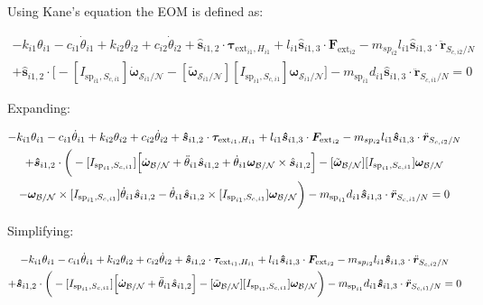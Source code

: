 \documentclass[paper]{aiaaNew}
\begin{document}
Using Kane's equation the EOM is defined as:

\begin{multline}
-k_{i1} \theta_{i1} - c_{i1} \dot{\theta}_{i1} + k_{i2} \theta_{i2} + c_{i2} \dot{\theta}_{i2} + \bm{\hat{s}}_{i1,2} \cdot \bm \tau_{\text{ext}_{i1},H_{i1}}  + l_{i1} \bm{\hat{s}}_{i1,3} \cdot \bm F_{\text{ext}_{i2}}  - m_{sp_{i2}} l_{i1} \bm{\hat{s}}_{i1,3} \cdot \ddot{\bm{r}}_{S_{c,i2}/N} \\
+ \bm{\hat{s}}_{i1,2} \cdot \Big[-[I_{\text{sp}_{i1},S_{c,i1}}] \dot{\bm\omega}_{\mathcal{S}_{i1}/\mathcal{N}}  -[\tilde{\bm \omega}_{\mathcal{S}_{i1}/\mathcal{N}}] [I_{\text{sp}_{i1},S_{c,i1}}] \bm \omega_{\mathcal{S}_{i1}/\mathcal{N}} \Big] -m_{\text{sp}_{i1}} d_{i1} \bm{\hat{s}}_{i1,3} \cdot \ddot{\bm{r}}_{S_{c,i1}/N} = 0
\end{multline}

Expanding:

\begin{multline}
-k_{i1} \theta_{i1} - c_{i1} \dot{\theta}_{i1} + k_{i2} \theta_{i2} + c_{i2} \dot{\theta}_{i2} + \bm{\hat{s}}_{i1,2} \cdot \bm \tau_{\text{ext}_{i1},H_{i1}}  + l_{i1} \bm{\hat{s}}_{i1,3} \cdot \bm F_{\text{ext}_{i2}}  - m_{sp_{i2}} l_{i1} \bm{\hat{s}}_{i1,3} \cdot \ddot{\bm{r}}_{S_{c,i2}/N} \\
+ \bm{\hat{s}}_{i1,2} \cdot \bigg(-[I_{\text{sp}_{i1},S_{c,i1}}] \Big[\dot{\bm \omega}_{\cal{B/N}} + \ddot{\theta}_{i1} \hat{\bm s}_{i1,2} + \dot{\theta}_{i1} \bm \omega_{\cal{B/N}} \times \hat{\bm s}_{i1,2}\Big] 
-[\tilde{\bm \omega}_{\cal{B/N}}] [I_{\text{sp}_{i1},S_{c,i1}}] \bm \omega_{\cal{B/N}}\\
 -\bm \omega_{\cal{B/N}} \times [I_{\text{sp}_{i1},S_{c,i1}}] \dot{\theta}_{i1} \hat{\bm s}_{i1,2} -\dot{\theta}_{i1} \hat{\bm s}_{i1,2} \times [I_{\text{sp}_{i1},S_{c,i1}}] \bm \omega_{\cal{B/N}}\bigg) -m_{\text{sp}_{i1}} d_{i1} \bm{\hat{s}}_{i1,3} \cdot \ddot{\bm{r}}_{S_{c,i1}/N} = 0
\end{multline}

Simplifying:

\begin{multline}
	-k_{i1} \theta_{i1} - c_{i1} \dot{\theta}_{i1} + k_{i2} \theta_{i2} + c_{i2} \dot{\theta}_{i2} + \bm{\hat{s}}_{i1,2} \cdot \bm \tau_{\text{ext}_{i1},H_{i1}}  + l_{i1} \bm{\hat{s}}_{i1,3} \cdot \bm F_{\text{ext}_{i2}}  - m_{sp_{i2}} l_{i1} \bm{\hat{s}}_{i1,3} \cdot \ddot{\bm{r}}_{S_{c,i2}/N} \\
	+ \bm{\hat{s}}_{i1,2} \cdot \bigg(-[I_{\text{sp}_{i1},S_{c,i1}}] \Big[\dot{\bm \omega}_{\cal{B/N}} + \ddot{\theta}_{i1} \hat{\bm s}_{i1,2}\Big]  
	-[\tilde{\bm \omega}_{\cal{B/N}}] [I_{\text{sp}_{i1},S_{c,i1}}] \bm \omega_{\cal{B/N}} \bigg) -m_{\text{sp}_{i1}} d_{i1} \bm{\hat{s}}_{i1,3} \cdot \ddot{\bm{r}}_{S_{c,i1}/N} = 0
\end{multline}
\end{document}
